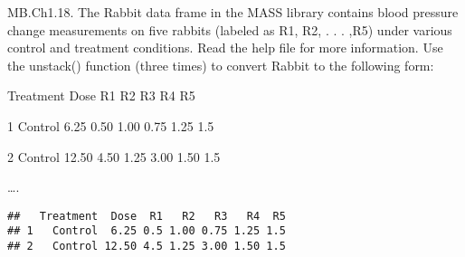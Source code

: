 \documentclass[
]{article}
\newenvironment{Shaded}{\begin{snugshade}}{\end{snugshade}}
\newcommand{\DataTypeTok}[1]{\textcolor[rgb]{0.13,0.29,0.53}{#1}}
\newcommand{\FloatTok}[1]{\textcolor[rgb]{0.00,0.00,0.81}{#1}}
\newcommand{\KeywordTok}[1]{\textcolor[rgb]{0.13,0.29,0.53}{\textbf{#1}}}
\newcommand{\NormalTok}[1]{#1}
\newcommand{\OperatorTok}[1]{\textcolor[rgb]{0.81,0.36,0.00}{\textbf{#1}}}
\newcommand{\StringTok}[1]{\textcolor[rgb]{0.31,0.60,0.02}{#1}}
\begin{document}
MB.Ch1.18. The Rabbit data frame in the MASS library contains blood
pressure change measurements on five rabbits (labeled as R1, R2, . . .
,R5) under various control and treatment conditions. Read the help file
for more information. Use the unstack() function (three times) to
convert Rabbit to the following form:

Treatment Dose R1 R2 R3 R4 R5

1 Control 6.25 0.50 1.00 0.75 1.25 1.5

2 Control 12.50 4.50 1.25 3.00 1.50 1.5

\ldots.

\begin{Shaded}
\end{Shaded}

\begin{verbatim}
##   Treatment  Dose  R1   R2   R3   R4  R5
## 1   Control  6.25 0.5 1.00 0.75 1.25 1.5
## 2   Control 12.50 4.5 1.25 3.00 1.50 1.5
\end{verbatim}
\end{document}
